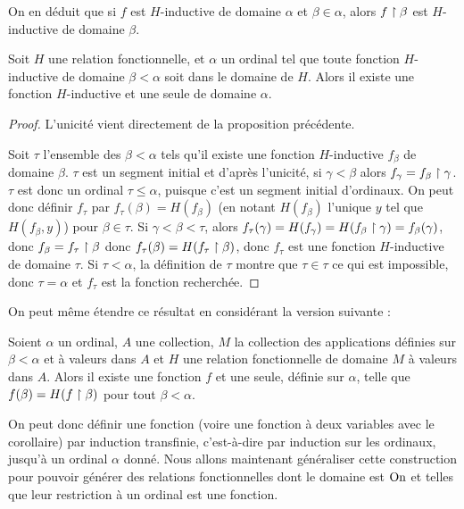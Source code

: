 On en déduit que si $f$ est $H$-inductive de domaine $\alpha$ et $\beta\in\alpha$, alors $f\upharpoonright\beta$ est $H$-inductive de domaine $\beta$.

\begin{them}
    Soit $H$ une relation fonctionnelle, et $\alpha$ un ordinal tel que toute fonction $H$-inductive de domaine $\beta < \alpha$ soit dans le domaine de $H$. Alors il existe une fonction $H$-inductive et une seule de domaine $\alpha$.
\end{them}

\begin{proof}
    L'unicité vient directement de la proposition précédente.

    Soit $\tau$ l'ensemble des $\beta < \alpha$ tels qu'il existe une fonction $H$-inductive $f_\beta$ de domaine $\beta$. $\tau$ est un segment initial et d'après l'unicité, si $\gamma < \beta$ alors $f_\gamma = f_\beta\upharpoonright \gamma$. $\tau$ est donc un ordinal $\tau \leq \alpha$, puisque c'est un segment initial d'ordinaux. On peut donc définir $f_\tau$ par $f_\tau(\beta) = H(f_\beta)$ (en notant $H(f_\beta)$ l'unique $y$ tel que $H(f_\beta,y)$) pour $\beta\in\tau$. Si $\gamma < \beta < \tau$, alors $f_\tau(\gamma) = H(f_\gamma) = H(f_\beta\upharpoonright\gamma) = f_\beta(\gamma)$, donc $f_\beta = f_\tau\upharpoonright\beta$ donc $f_\tau(\beta) = H(f_\tau\upharpoonright\beta)$, donc $f_\tau$ est une fonction $H$-inductive de domaine $\tau$. Si $\tau < \alpha$, la définition de $\tau$ montre que $\tau\in \tau$ ce qui est impossible, donc $\tau = \alpha$ et $f_\tau$ est la fonction recherchée.
\end{proof}

On peut même étendre ce résultat en considérant la version suivante :

\begin{cor}\label{cor:bla}
    Soient $\alpha$ un ordinal, $A$ une collection, $M$ la collection des applications définies sur $\beta < \alpha$ et à valeurs dans $A$ et $H$ une relation fonctionnelle de domaine $M$ à valeurs dans $A$. Alors il existe une fonction $f$ et une seule, définie sur $\alpha$, telle que $f(\beta) = H(f\upharpoonright\beta)$ pour tout $\beta < \alpha$.
\end{cor}

On peut donc définir une fonction (voire une fonction à deux variables avec le corollaire) par induction transfinie, c'est-à-dire par induction sur les ordinaux, jusqu'à un ordinal $\alpha$ donné. Nous allons maintenant généraliser cette construction pour pouvoir générer des relations fonctionnelles dont le domaine est $\mathrm{On}$ et telles que leur restriction à un ordinal est une fonction.

